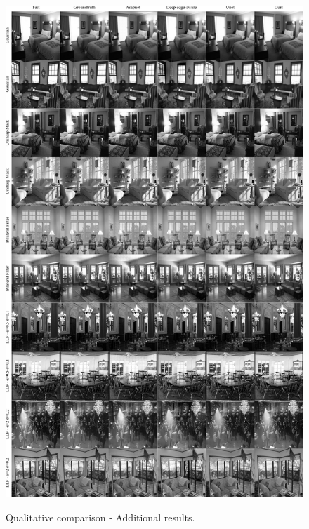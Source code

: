 \begin{figure}[ht]
  \centering

  {\includegraphics[width=0.9\linewidth]{Chapters/appendix-figs/room.pdf}}

   \caption{Qualitative comparison - Additional results.}
   \label{fig:appendix-tat2}
\end{figure}


